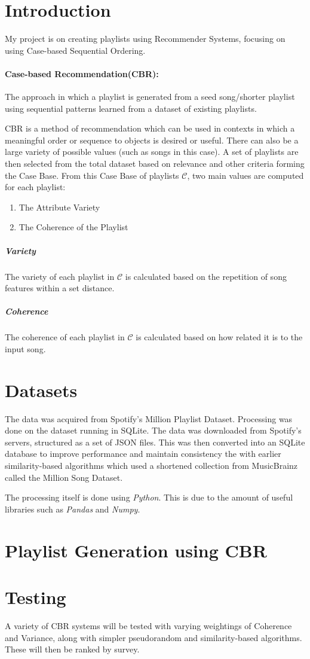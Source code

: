 \documentclass[a4paper, 12pt]{article}
\begin{document}
\section{Introduction}
My project is on creating playlists using Recommender Systems, focusing on using Case-based Sequential Ordering. 

\paragraph{Case-based Recommendation(CBR):}
The approach in which a playlist is generated from a seed song/shorter playlist using sequential patterns learned from 
a dataset of existing playlists.


CBR is a method of recommendation which can be used in contexts in which a meaningful order or sequence to objects is desired or useful.
There can also be a large variety of possible values (such as songs in this case).
A set of playlists are then selected from the total dataset based on relevance and other criteria forming the Case Base.
From this Case Base of playlists \(\mathcal{C}\), two main values are computed for each playlist:
\begin{enumerate}
    \item The Attribute Variety
    \item The Coherence of the Playlist
\end{enumerate}

\subparagraph*{Variety}
The variety of each playlist in \(\mathcal{C}\) is calculated based on the repetition of song features within a set distance.
\subparagraph*{Coherence}
The coherence of each playlist in \(\mathcal{C}\) is calculated based on how related it is to the input song. 

\section{Datasets}
The data was acquired from Spotify's Million Playlist Dataset.
Processing was done on the dataset running in SQLite.
The data was downloaded from Spotify's servers, structured as a set of JSON files.
This was then converted into an SQLite database to improve performance and maintain consistency the with earlier similarity-based 
algorithms which used a shortened collection from MusicBrainz called the Million Song Dataset.

The processing itself is done using \emph{Python}. This is due to the amount of useful libraries such as \emph{Pandas} and \emph{Numpy}. 

\section{Playlist Generation using CBR}


\section{Testing}
A variety of CBR systems will be tested with varying weightings of Coherence and Variance, along with simpler pseudorandom and similarity-based algorithms.
These will then be ranked by survey.

\printbibliography
\end{document}
